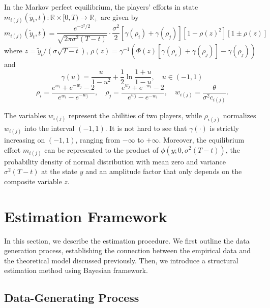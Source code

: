 \documentclass[mnsc]{informs3}
\begin{document}
\begin{lemma}
In the Markov perfect equilibrium, the players’ efforts in state $m_{i(j)}(\tilde{y}_t, t) :\mathbb{R}\times[0, T)\to\mathbb{R}_+$ are given by
\begin{equation}\label{eq-equilibrium-effort}
m_{i(j)}(\tilde{y}_t, t) = \frac{e^{-z^2/2}}{\sqrt{2\pi\sigma^2(T-t)}}\cdot \frac{\sigma^2}{2}\left[\gamma(\rho_{i}) + \gamma(\rho_{j})\right]\left[1-\rho(z)^2\right]\left[1 \pm \rho(z)\right]
\end{equation}
where $z = \tilde{y}_t / (\sigma\sqrt{T-t})$, $\rho(z) = \gamma^{-1}\left(\Phi(z)\left[\gamma(\rho_{i})+\gamma(\rho_{j})\right]-\gamma(\rho_{j})\right)$ and 
\begin{equation*}
\gamma(u) = \frac{u}{1-u^2} + \frac{1}{2}\ln\frac{1+u}{1-u},\quad u\in(-1,1)
\end{equation*}
\begin{equation*}
\rho_{i} = \frac{e^{w_{i}}+e^{-w_{j}}-2}{e^{w_{i}}-e^{-w_{j}}},
\quad
\rho_{j} = \frac{e^{w_{j}}+e^{-w_{i}}-2}{e^{w_{j}}-e^{-w_{i}}},
\quad
w_{i(j)} = \frac{\theta}{\sigma^2 c_{i(j)}}.
\end{equation*}
\end{lemma}

The variables $w_{i(j)}$ represent the abilities of two players, while $\rho_{i(j)}$ normalizes $w_{i(j)}$ into the interval $(-1, 1)$. 
It is not hard to see that $\gamma(\cdot)$ is strictly increasing on $(-1,1)$, ranging from $-\infty$ to $+\infty$. 
Moreover, the equilibrium effort $m_{i(j)}$ can be represented to the product of $\phi(y; 0, \sigma^2(T-t))$, the probability density of normal distribution with mean zero and variance $\sigma^2(T-t)$ at the state $y$ and an amplitude factor that only depends on the composite variable $z$. 





\section{Estimation Framework}

In this section, we describe the estimation procedure. 
We first outline the data generation process, establishing the connection between the empirical data and the theoretical model discussed previously.
Then, we introduce a structural estimation method using Bayesian framework.

\subsection{Data-Generating Process}
\end{document}
